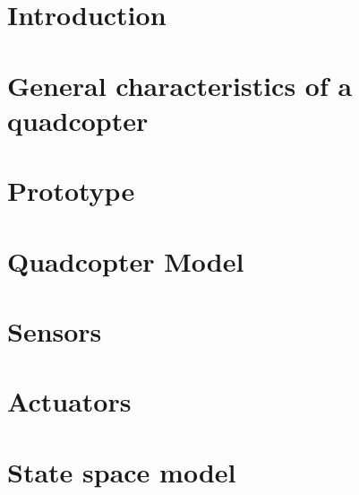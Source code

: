 




\sloppy
{}


\cleardoublepage

\date{\today}
\cleardoublepage

\tableofcontents

\cleardoublepage



\chapter{Introduction}\label{ch:introduction}

\clearpage

\chapter{General characteristics of a quadcopter}\label{ch:problemdesc}


\clearpage

\chapter{Prototype}\label{ch:psetup}


\clearpage

\chapter{Quadcopter Model}\label{ch:quadmodelling}

\clearpage

%

\chapter{Sensors}\label{ch:lab}


\clearpage
\chapter{Actuators}\label{ch:lab}


\clearpage

\chapter{State space model}\label{ch:lab}

\clearpage

